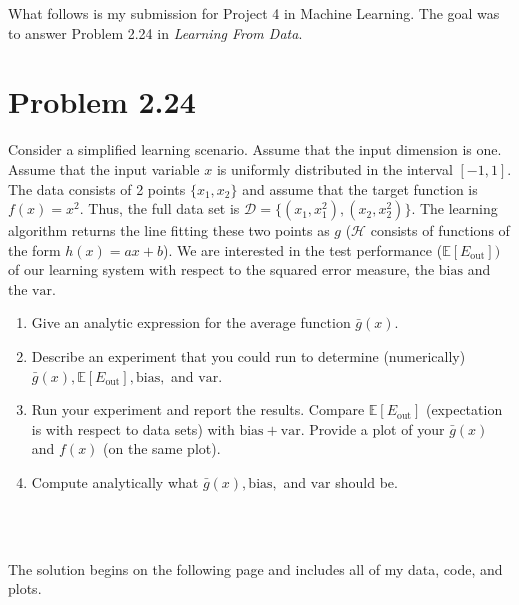 \documentclass[12pt]{article}
\newcommand{\Data}{\mathcal{D}}
\newcommand{\Expect}{\mathbb{E}}
\newcommand{\ErrOut}{E_{\text{out}}}
\newcommand{\Bias}{\bm{\mathrm{bias}}}
\newcommand{\Var}{\bm{\mathrm{var}}}
\begin{document}
What follows is my submission for Project 4 in Machine Learning.  The goal was to answer Problem 2.24 in \textit{Learning From Data}.\cite{AML:LFD}   

\section*{Problem 2.24\cite{AML:LFD}}

Consider a simplified learning scenario.  Assume that the input dimension is one.  Assume that the input variable $x$ is uniformly distributed in the interval $[-1, 1]$.  The data consists of 2 points $\{x_{1}, x_{2}\}$ and assume that the target function is $f(x) = x^{2}$.  Thus, the full data set is $\Data = \{(x_{1}, x_{1}^{2}), (x_{2}, x_{2}^{2})\}$.  The learning algorithm returns the line fitting these two points as $g$ ($\mathcal{H}$ consists of functions of the form $h(x) = ax + b$).  We are interested in the test performance ($\Expect[\ErrOut])$ of our learning system with respect to the squared error measure, the $\Bias$ and the $\Var$.
\begin{enumerate}
    \item Give an analytic expression for the average function $\bar{g}(x)$.
    \item Describe an experiment that you could run to determine (numerically) $\bar{g}(x), \Expect[\ErrOut], \Bias,$ and $\Var$.
    \item Run your experiment and report the results.  Compare $\Expect[\ErrOut]$ (expectation is with respect to data sets) with $\Bias + \Var$.  Provide a plot of your $\bar{g}(x)$ and $f(x)$ (on the same plot).
\item Compute analytically what $\bar{g}(x), \Bias,$ and $\Var$ should be.
\end{enumerate}
\\\\
\par The solution begins on the following page and includes all of my data, code, and plots.

\pagebreak
\end{document}
